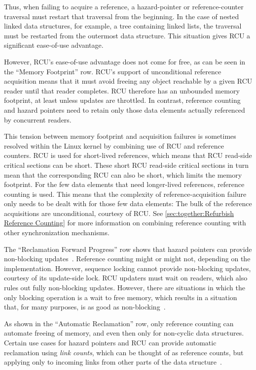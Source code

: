 Thus, when failing to acquire a reference, a hazard-pointer or
reference-counter traversal must restart that traversal from the
beginning.
In the case of nested linked data structures, for example, a
tree containing linked lists, the traversal must be restarted from
the outermost data structure.
This situation gives RCU a significant ease-of-use advantage.

However, RCU's ease-of-use advantage does not come
for free, as can be seen in the ``Memory Footprint'' row.
RCU's support of unconditional reference acquisition means that
it must avoid freeing any object reachable by a given
RCU reader until that reader completes.
RCU therefore has an unbounded memory footprint, at least unless updates
are throttled.
In contrast, reference counting and hazard pointers need to retain only
those data elements actually referenced by concurrent readers.

This tension between memory footprint and acquisition
failures is sometimes resolved within the Linux kernel by combining use
of RCU and reference counters.
RCU is used for short-lived references, which means that RCU read-side
critical sections can be short.
These short RCU read-side critical sections in turn mean that the corresponding
RCU  can also be short, which limits the memory footprint.
For the few data elements that need longer-lived references, reference
counting is used.
This means that the complexity of reference-acquisition failure only
needs to be dealt with for those few data elements:
The bulk of the reference acquisitions are unconditional, courtesy of RCU\@.
See \cref{sec:together:Refurbish Reference Counting}
for more information on combining reference counting with other
synchronization mechanisms.

The ``Reclamation Forward Progress'' row shows that hazard pointers
can provide non-blocking updates~\cite{MagedMichael04a,HerlihyLM02}.
Reference counting might or might not, depending on the implementation.
However, sequence locking cannot provide non-blocking updates, courtesy
of its update-side lock.
RCU updaters must wait on readers, which also rules out fully non-blocking
updates.
However, there are situations in which the only blocking operation is
a wait to free memory, which results in a situation that, for many
purposes, is as good as non-blocking~\cite{MathieuDesnoyers2012URCU}.

As shown in the ``Automatic Reclamation'' row, only reference
counting can automate freeing of memory, and even then only
for non-cyclic data structures.
Certain use cases for hazard pointers and RCU can provide automatic
reclamation using \emph{link counts}, which can be thought of as
reference counts, but applying only to incoming links from other
parts of the data structure~\cite{MagedMichael2018FollyHazptr}.

